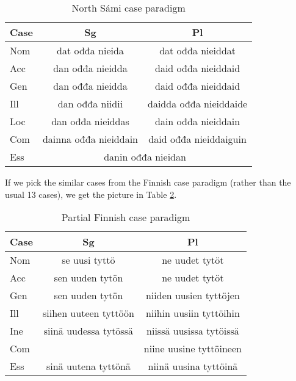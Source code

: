 \documentclass[a4paper,english]{article} %
\begin{document}
\begin{table}[htdp]
\caption{North Sámi case paradigm}
\begin{center}
\begin{tabular}{|l|c|c|}
\hline
Case  & Sg       & Pl                        \\ \hline
Nom    & dat ođđa nieida      & dat ođđa nieiddat           \\ \hline
Acc    & dan ođđa nieidda    & daid ođđa nieiddaid         \\ \hline
Gen    & dan ođđa nieidda    & daid ođđa nieiddaid         \\ \hline
Ill    & dan ođđa niidii   & daidda ođđa nieiddaide      \\ \hline
Loc    & dan ođđa nieiddas   & dain ođđa nieiddain          \\ \hline
Com    & dainna ođđa nieiddain & daid ođđa  nieiddaiguin     \\ \hline
Ess & \multicolumn{2}{c|}{danin ođđa nieidan}      \\ \hline
\end{tabular}
\end{center}
\label{smecas}
\end{table}%

If we pick the similar cases from the Finnish case paradigm (rather than the usual 13 cases), we get the picture in Table \ref{fincas}.%

\begin{table}[htdp]
\caption{Partial Finnish case paradigm}
\begin{center}
\begin{tabular}{|l|c|c|}
\hline
Case  & Sg       & Pl                        \\ \hline
Nom    & se    uusi tyttö       & ne uudet tytöt      \\ \hline
Acc    & sen    uuden tytön     & ne uudet tytöt     \\ \hline
Gen    & sen    uuden tytön     & niiden uusien tyttöjen     \\ \hline
Ill    & siihen uuteen tyttöön  & niihin uusiin tyttöihin   \\ \hline
Ine    & siinä uudessa tytössä  & niissä uusissa tytöissä      \\ \hline
Com    &                        & niine  uusine tyttöineen     \\ \hline
Ess    & sinä uutena tyttönä    & niinä uusina tyttöinä      \\ \hline
\end{tabular}
\end{center}
\label{fincas}
\end{table}%
\end{document}
